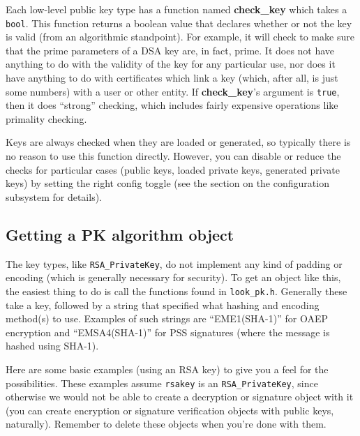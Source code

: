\documentclass{article}
\newcommand{\filename}[1]{\texttt{#1}}
\newcommand{\function}[1]{\textbf{#1}}
\newcommand{\type}[1]{\texttt{#1}}
\begin{document}
Each low-level public key type has a function named \function{check\_key} which
takes a \type{bool}. This function returns a boolean value that declares
whether or not the key is valid (from an algorithmic standpoint). For example,
it will check to make sure that the prime parameters of a DSA key are, in fact,
prime. It does not have anything to do with the validity of the key for any
particular use, nor does it have anything to do with certificates which link a
key (which, after all, is just some numbers) with a user or other entity. If
\function{check\_key}'s argument is \type{true}, then it does ``strong''
checking, which includes fairly expensive operations like primality checking.

Keys are always checked when they are loaded or generated, so typically there
is no reason to use this function directly. However, you can disable or reduce
the checks for particular cases (public keys, loaded private keys, generated
private keys) by setting the right config toggle (see the section on the
configuration subsystem for details).

\subsection{Getting a PK algorithm object}

The key types, like \type{RSA\_PrivateKey}, do not implement any kind of
padding or encoding (which is generally necessary for security). To get an
object like this, the easiest thing to do is call the functions found in
\filename{look\_pk.h}. Generally these take a key, followed by a string that
specified what hashing and encoding method(s) to use. Examples of such strings
are ``EME1(SHA-1)'' for OAEP encryption and ``EMSA4(SHA-1)'' for PSS signatures
(where the message is hashed using SHA-1).

Here are some basic examples (using an RSA key) to give you a feel for the
possibilities. These examples assume \type{rsakey} is an
\type{RSA\_PrivateKey}, since otherwise we would not be able to create a
decryption or signature object with it (you can create encryption or signature
verification objects with public keys, naturally). Remember to delete these
objects when you're done with them.
\end{document}
